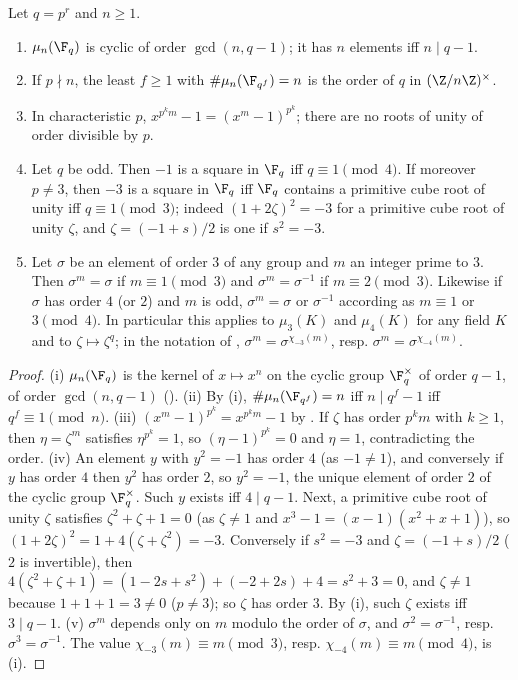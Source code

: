 \begin{proposition}\label{prop:rings:mu-in-fq}
Let $q=p^r$ and $n\ge1$.
\begin{enumerate}[label=(\roman*)]
\item $\mu_n(\F_q)$ is cyclic of order $\gcd(n,q-1)$; it has $n$ elements iff $n\mid q-1$.
\item If $p\nmid n$, the least $f\ge1$ with $\#\mu_n(\F_{q^f})=n$ is the order of $q$ in $(\Z/n\Z)^\times$.
\item In characteristic $p$, $x^{p^km}-1=(x^m-1)^{p^k}$; there are no roots of unity of order divisible by $p$.
\item Let $q$ be odd. Then $-1$ is a square in $\F_q$ iff $q\equiv1\pmod4$. If moreover $p\ne3$, then $-3$ is a square in $\F_q$ iff $\F_q$ contains a
primitive cube root of unity iff $q\equiv1\pmod3$; indeed $(1+2\zeta)^2=-3$ for a primitive cube root of unity $\zeta$, and $\zeta=(-1+s)/2$ is one if
$s^2=-3$.
\item Let $\sigma$ be an element of order $3$ of any group and $m$ an integer prime to $3$. Then $\sigma^m=\sigma$ if $m\equiv1\pmod3$ and
$\sigma^m=\sigma^{-1}$ if $m\equiv2\pmod3$. Likewise if $\sigma$ has order $4$ (or $2$) and $m$ is odd, $\sigma^m=\sigma$ or $\sigma^{-1}$ according as $m\equiv1$ or
$3\pmod4$. In particular this applies to $\mu_3(K)$ and $\mu_4(K)$ for any field $K$ and to $\zeta\mapsto\zeta^q$; in the notation of
, $\sigma^m=\sigma^{\chi_{-3}(m)}$, resp. $\sigma^m=\sigma^{\chi_{-4}(m)}$.
\end{enumerate}
\end{proposition}

\begin{proof}
(i) $\mu_n(\F_q)$ is the kernel of $x\mapsto x^n$ on the cyclic group $\F_q^\times$ of order $q-1$, of order $\gcd(n,q-1)$ ().
(ii) By (i), $\#\mu_n(\F_{q^f})=n$ iff $n\mid q^f-1$ iff $q^f\equiv1\pmod n$.
(iii) $(x^m-1)^{p^k}=x^{p^km}-1$ by . If $\zeta$ has order $p^km$ with $k\ge1$, then $\eta=\zeta^m$ satisfies $\eta^{p^k}=1$, so $(\eta-1)^{p^k}=0$
and $\eta=1$, contradicting the order.
(iv) An element $y$ with $y^2=-1$ has order $4$ (as $-1\ne1$), and conversely if $y$ has order $4$ then $y^2$ has order $2$, so $y^2=-1$, the
unique element of order $2$ of the cyclic group $\F_q^\times$. Such $y$ exists iff $4\mid q-1$. Next, a primitive cube root of unity $\zeta$ satisfies
$\zeta^2+\zeta+1=0$ (as $\zeta\ne1$ and $x^3-1=(x-1)(x^2+x+1)$), so $(1+2\zeta)^2=1+4(\zeta+\zeta^2)=-3$. Conversely if $s^2=-3$ and $\zeta=(-1+s)/2$ ($2$ is
invertible), then $4(\zeta^2+\zeta+1)=(1-2s+s^2)+(-2+2s)+4=s^2+3=0$, and $\zeta\ne1$ because $1+1+1=3\ne0$ ($p\ne3$); so $\zeta$ has order $3$. By (i),
such $\zeta$ exists iff $3\mid q-1$.
(v) $\sigma^m$ depends only on $m$ modulo the order of $\sigma$, and $\sigma^2=\sigma^{-1}$, resp. $\sigma^3=\sigma^{-1}$. The value $\chi_{-3}(m)\equiv m\pmod3$, resp.
$\chi_{-4}(m)\equiv m\pmod4$, is (i).
\end{proof}

